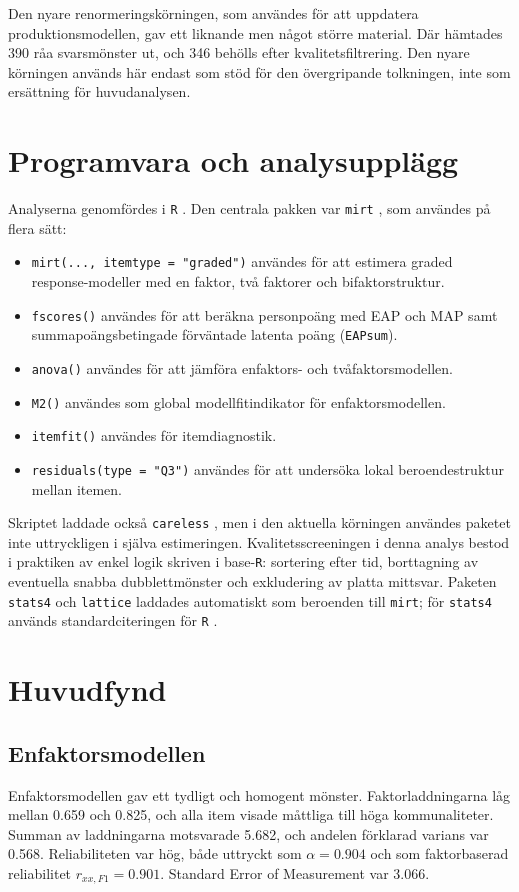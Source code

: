 \documentclass[11pt,a4paper]{article}
\begin{document}
Den nyare renormeringskörningen, som användes för att uppdatera produktionsmodellen, gav ett liknande men något större material. Där hämtades 390 råa svarsmönster ut, och 346 behölls efter kvalitetsfiltrering. Den nyare körningen används här endast som stöd för den övergripande tolkningen, inte som ersättning för huvudanalysen.

\section{Programvara och analysupplägg}
Analyserna genomfördes i \texttt{R} \parencite{RCore2026}. Den centrala pakken var \texttt{mirt} \parencite{Chalmers2012mirt}, som användes på flera sätt:

\begin{itemize}
\item \texttt{mirt(..., itemtype = "graded")} användes för att estimera graded response-modeller med en faktor, två faktorer och bifaktorstruktur.
\item \texttt{fscores()} användes för att beräkna personpoäng med EAP och MAP samt summapoängsbetingade förväntade latenta poäng (\texttt{EAPsum}).
\item \texttt{anova()} användes för att jämföra enfaktors- och tvåfaktorsmodellen.
\item \texttt{M2()} användes som global modellfitindikator för enfaktorsmodellen.
\item \texttt{itemfit()} användes för itemdiagnostik.
\item \texttt{residuals(type = "Q3")} användes för att undersöka lokal beroendestruktur mellan itemen.
\end{itemize}

Skriptet laddade också \texttt{careless} \parencite{YentesWilhelm2023careless}, men i den aktuella körningen användes paketet inte uttryckligen i själva estimeringen. Kvalitetsscreeningen i denna analys bestod i praktiken av enkel logik skriven i base-\texttt{R}: sortering efter tid, borttagning av eventuella snabba dubblettmönster och exkludering av platta mittsvar. Paketen \texttt{stats4} och \texttt{lattice} \parencite{Sarkar2008lattice} laddades automatiskt som beroenden till \texttt{mirt}; för \texttt{stats4} används standardciteringen för \texttt{R} \parencite{RCore2026}.

\section{Huvudfynd}
\subsection{Enfaktorsmodellen}
Enfaktorsmodellen gav ett tydligt och homogent mönster. Faktorladdningarna låg mellan 0.659 och 0.825, och alla item visade måttliga till höga kommunaliteter. Summan av laddningarna motsvarade 5.682, och andelen förklarad varians var 0.568. Reliabiliteten var hög, både uttryckt som $\alpha = 0.904$ och som faktorbaserad reliabilitet $r_{xx,F1} = 0.901$. Standard Error of Measurement var 3.066.
\end{document}
